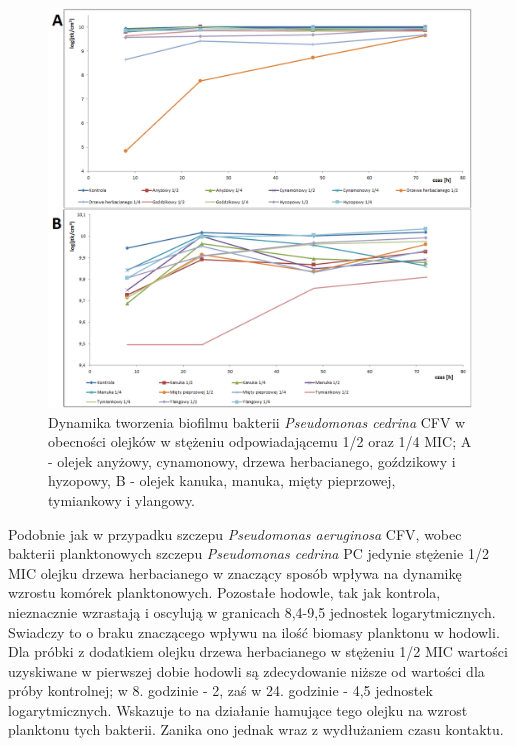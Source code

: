 \documentclass[11pt,a4paper]{report}
\begin{document}
\begin{figure}[!h]
\begin{center}
\includegraphics[scale=0.50]{img/cfv-c.png}
\caption{Dynamika tworzenia biofilmu bakterii \textit{Pseudomonas cedrina} CFV w obecności olejków w stężeniu odpowiadającemu 1/2 oraz 1/4 MIC; A - olejek anyżowy, cynamonowy, drzewa herbacianego, goździkowy i hyzopowy, B - olejek kanuka, manuka, mięty pieprzowej, tymiankowy i ylangowy.}\label{cfv-c}
\end{center} 
\end{figure}

\clearpage

Podobnie jak w przypadku szczepu \textit{Pseudomonas aeruginosa} CFV, wobec bakterii planktonowych szczepu \textit{Pseudomonas cedrina} PC jedynie stężenie 1/2 MIC olejku drzewa herbacianego w znaczący sposób wpływa na dynamikę wzrostu komórek planktonowych. Pozostałe hodowle, tak jak kontrola, nieznacznie wzrastają i oscylują w granicach 8,4-9,5 jednostek logarytmicznych. Swiadczy to o braku znaczącego wpływu na ilość biomasy planktonu w hodowli.\\
Dla próbki z dodatkiem olejku drzewa herbacianego w stężeniu 1/2 MIC wartości uzyskiwane w pierwszej dobie hodowli są zdecydowanie niższe od wartości dla próby kontrolnej; w 8. godzinie - 2, zaś w 24. godzinie - 4,5 jednostek logarytmicznych. Wskazuje to na działanie hamujące tego olejku na wzrost planktonu tych bakterii. Zanika ono jednak wraz z wydłużaniem czasu kontaktu.
\end{document}

